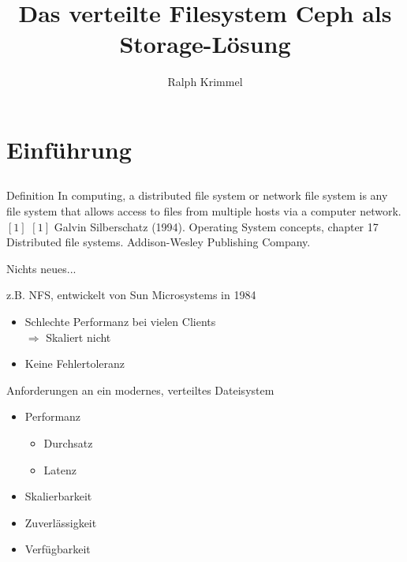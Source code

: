 \documentclass[notes=hide,yellow]{beamer}
\title{Das verteilte Filesystem Ceph als Storage-Lösung}
\subtitle{ }
\author{Ralph Krimmel}
\begin{document}
	\nocite{*} 
	\begin{frame}
		\titlepage
	\end{frame}

	\begin{frame}
		\tableofcontents
	\end{frame}


\section{Einf\"uhrung}
\subsection*{}

\begin{frame}{Definition}
		In computing, a distributed file system or network file system is any file system that allows access to files from multiple hosts via a computer network.$[1]$
	\tiny{$[1]$ Galvin Silberschatz (1994). Operating System concepts, chapter 17 Distributed file systems. Addison-Wesley Publishing Company.} \\ 
\end{frame}

\begin{frame}{Nichts neues...}

		z.B. NFS, entwickelt von Sun Microsystems in 1984
		\begin{itemize}
			\item Schlechte Performanz bei vielen Clients \\ $\Rightarrow$ Skaliert nicht
			\item Keine Fehlertoleranz
		\end{itemize}
\end{frame}




\begin{frame}{Anforderungen an ein modernes, verteiltes Dateisystem}
	\begin{itemize}
		\item Performanz
			\begin{itemize}
				\item Durchsatz
				\item Latenz
			\end{itemize}
		\item Skalierbarkeit
		\item Zuverl\"assigkeit
		\item Verf\"ugbarkeit
	\end{itemize}
\end{frame}
\end{document}
